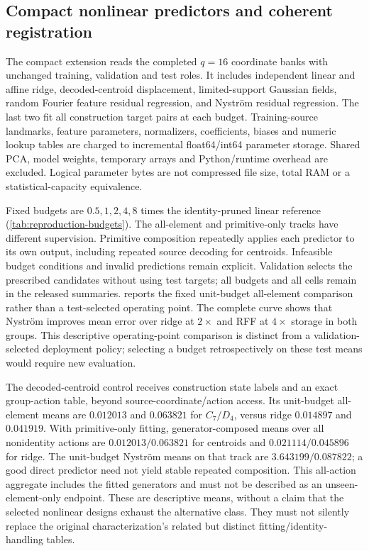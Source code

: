 \subsection{Compact nonlinear predictors and coherent registration}
The compact extension reads the completed $q=16$ coordinate banks with unchanged training, validation and test roles. It includes independent linear and affine ridge, decoded-centroid displacement, limited-support Gaussian fields, random Fourier feature residual regression, and Nystr\"om residual regression. The last two fit all construction target pairs at each budget. Training-source landmarks, feature parameters, normalizers, coefficients, biases and numeric lookup tables are charged to incremental float64/int64 parameter storage. Shared PCA, model weights, temporary arrays and Python/runtime overhead are excluded. Logical parameter bytes are not compressed file size, total RAM or a statistical-capacity equivalence.



Fixed budgets are $0.5,1,2,4,8$ times the identity-pruned linear reference (\cref{tab:reproduction-budgets}). The all-element and primitive-only tracks have different supervision. Primitive composition repeatedly applies each predictor to its own output, including repeated source decoding for centroids. Infeasible budget conditions and invalid predictions remain explicit. Validation selects the prescribed candidates without using test targets; all budgets and all cells remain in the released summaries.  reports the fixed unit-budget all-element comparison rather than a test-selected operating point. The complete curve shows that Nystr\"om improves mean error over ridge at $2\times$ and RFF at $4\times$ storage in both groups. This descriptive operating-point comparison is distinct from a validation-selected deployment policy; selecting a budget retrospectively on these test means would require new evaluation.

The decoded-centroid control receives construction state labels and an exact group-action table, beyond source-coordinate/action access. Its unit-budget all-element means are $0.012013$ and $0.063821$ for $C_7/D_4$, versus ridge $0.014897$ and $0.041919$. With primitive-only fitting, generator-composed means over all nonidentity actions are $0.012013/0.063821$ for centroids and $0.021114/0.045896$ for ridge. The unit-budget Nystr\"om means on that track are $3.643199/0.087822$; a good direct predictor need not yield stable repeated composition. This all-action aggregate includes the fitted generators and must not be described as an unseen-element-only endpoint. These are descriptive means, without a claim that the selected nonlinear designs exhaust the alternative class. They must not silently replace the original characterization's related but distinct fitting/identity-handling tables.

